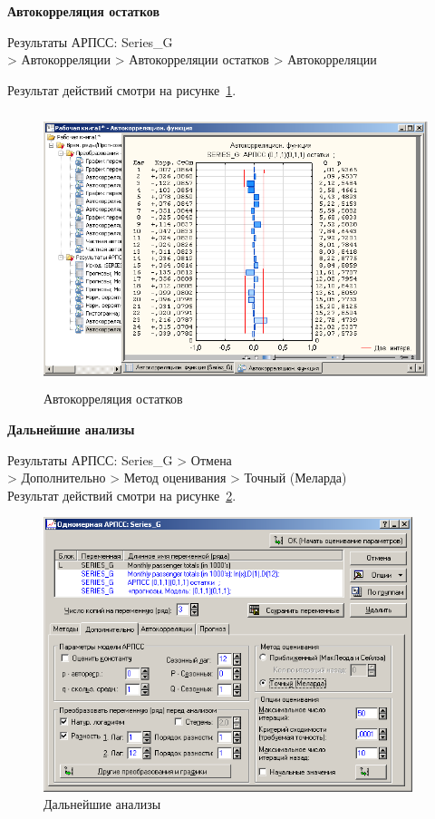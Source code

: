 \newpage

\begin{center}
  \textbf{Автокорреляция остатков}
\end{center}

Результаты АРПСС: Series\_G\\
> Автокорреляции
> Автокорреляции остатков
> Автокорреляции

Результат действий смотри на рисунке~\ref{fig:20}.

\begin{figure}[!h]
  \centering

  \includegraphics[height=8cm]
  {inc/Series_G/20.PNG}

  \caption{Автокорреляция остатков}

  \label{fig:20}
\end{figure}

\begin{center}
  \textbf{Дальнейшие анализы}
\end{center}

Результаты АРПСС: Series\_G > Отмена\\
> Дополнительно > Метод оценивания > Точный (Меларда)\\

Результат действий смотри на рисунке~\ref{fig:21}.

\begin{figure}[!h]
  \centering

  \includegraphics[height=8cm]
  {inc/Series_G/21.PNG}

  \caption{Дальнейшие анализы}

  \label{fig:21}
\end{figure}

